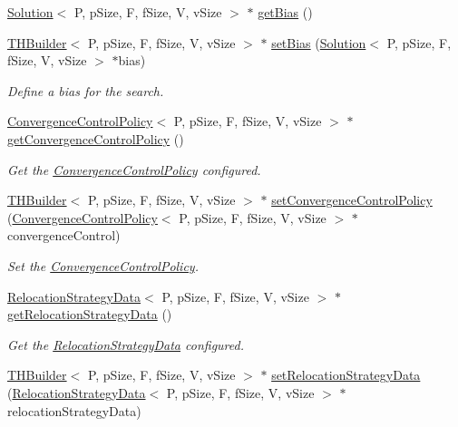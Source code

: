 \begin{DoxyCompactItemize}
\hyperlink{classSolution}{Solution}$<$ P, p\+Size, F, f\+Size, V, v\+Size $>$ $\ast$ \hyperlink{classTHBuilder_a2039c208430cd418c4d452ef300fe086}{get\+Bias} ()
\item 
\hyperlink{classTHBuilder}{T\+H\+Builder}$<$ P, p\+Size, F, f\+Size, V, v\+Size $>$ $\ast$ \hyperlink{classTHBuilder_a5f47578905fa8cf904dd02b83aa49927}{set\+Bias} (\hyperlink{classSolution}{Solution}$<$ P, p\+Size, F, f\+Size, V, v\+Size $>$ $\ast$bias)
\begin{DoxyCompactList}\small\item\em Define a bias for the search. \end{DoxyCompactList}\item 
\hyperlink{classConvergenceControlPolicy}{Convergence\+Control\+Policy}$<$ P, p\+Size, F, f\+Size, V, v\+Size $>$ $\ast$ \hyperlink{classTHBuilder_af3eb76a92cb3c0caf8452cdd9e26bac7}{get\+Convergence\+Control\+Policy} ()
\begin{DoxyCompactList}\small\item\em Get the \hyperlink{classConvergenceControlPolicy}{Convergence\+Control\+Policy} configured. \end{DoxyCompactList}\item 
\hyperlink{classTHBuilder}{T\+H\+Builder}$<$ P, p\+Size, F, f\+Size, V, v\+Size $>$ $\ast$ \hyperlink{classTHBuilder_a34fc0f328c6cdbe46f04bcb0e4cebde3}{set\+Convergence\+Control\+Policy} (\hyperlink{classConvergenceControlPolicy}{Convergence\+Control\+Policy}$<$ P, p\+Size, F, f\+Size, V, v\+Size $>$ $\ast$convergence\+Control)
\begin{DoxyCompactList}\small\item\em Set the \hyperlink{classConvergenceControlPolicy}{Convergence\+Control\+Policy}. \end{DoxyCompactList}\item 
\hyperlink{structRelocationStrategyData}{Relocation\+Strategy\+Data}$<$ P, p\+Size, F, f\+Size, V, v\+Size $>$ $\ast$ \hyperlink{classTHBuilder_a0a60bb8ec5f86ccef3ef4a12de34e24b}{get\+Relocation\+Strategy\+Data} ()
\begin{DoxyCompactList}\small\item\em Get the \hyperlink{structRelocationStrategyData}{Relocation\+Strategy\+Data} configured. \end{DoxyCompactList}\item 
\hyperlink{classTHBuilder}{T\+H\+Builder}$<$ P, p\+Size, F, f\+Size, V, v\+Size $>$ $\ast$ \hyperlink{classTHBuilder_a5edb000d129c799fd75541d71fd89a2b}{set\+Relocation\+Strategy\+Data} (\hyperlink{structRelocationStrategyData}{Relocation\+Strategy\+Data}$<$ P, p\+Size, F, f\+Size, V, v\+Size $>$ $\ast$relocation\+Strategy\+Data)

\end{DoxyCompactItemize}
